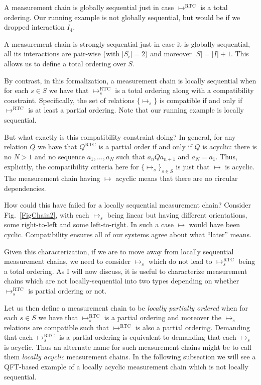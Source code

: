 \documentclass[prd,twocolumn,superscriptaddress,floatfix,amsmath,amssymb,amsfonts,nofootinbib]{revtex4-2}
\begin{document}
A measurement chain is globally sequential just in case  $\mapsto^\text{RTC}$ is a total ordering. Our running example is not globally sequential, but would be if we dropped interaction $I_4$.

A measurement chain is strongly sequential just in case it is globally sequential, all its interactions are pair-wise (with $\vert S_i\vert=2$) and moreover $\vert S\vert=\vert I\vert+1$. This allows us to define a total ordering over $S$.

By contrast, in this formalization, a measurement chain is locally sequential when for each $s\in S$ we have that $\mapsto^\text{RTC}_s$ is a total ordering along with a compatibility constraint. Specifically, the set of relations $\{\mapsto_s\}$ is compatible if and only if $\mapsto^\text{RTC}$ is at least a partial ordering. Note that our running example is locally sequential. 

But what exactly is this compatibility constraint doing? In general, for any relation $Q$ we have that $Q^\text{RTC}$ is a partial order if and only if $Q$ is acyclic: there is no $N>1$ and no sequence $a_1,\dots, a_N$ such that $a_n Q a_{n+1}$ and $a_N=a_1$. Thus, explicitly, the compatibility criteria here for $\{\mapsto_s\}_{s\in S}$ is just that $\mapsto$ is acyclic. The measurement chain having $\mapsto$ acyclic means that there are no circular dependencies.

How could this have failed for a locally sequential measurement chain? Consider Fig.~\ref{FigChain2}, with each $\mapsto_s$ being linear but having different orientations, some right-to-left and some left-to-right. In such a case $\mapsto$ would have been cyclic. Compatibility ensures all of our systems agree about what ``later'' means.

Given this characterization, if we are to move away from locally sequential measurement chains, we need to consider $\mapsto_s$ which do not lead to $\mapsto^\text{RTC}_s$ being a total ordering. As I will now discuss, it is useful to characterize measurement chains which are not locally-sequential into two types depending on whether $\mapsto^\text{RTC}_s$ is partial ordering or not.

Let us then define a measurement chain to be \textit{locally partially ordered} when for each $s\in S$ we have that $\mapsto^\text{RTC}_s$ is a partial ordering and moreover the $\mapsto_s$ relations are compatible such that $\mapsto^\text{RTC}$ is also a partial ordering. Demanding that each $\mapsto^\text{RTC}_s$ is a partial ordering is equivalent to demanding that each $\mapsto_s$ is acyclic. Thus an alternate name for such measurement chains might be to call them \textit{locally acyclic} measurement chains. In the following subsection we will see a QFT-based example of a locally acyclic measurement chain which is not locally sequential.
\end{document}
